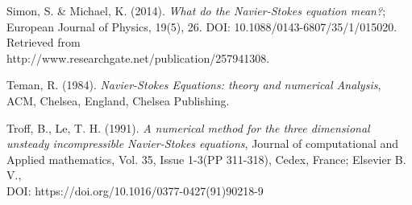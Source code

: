\documentclass[11pt]{report}
\begin{document}
\begin{description}
		\item Simon, S. \& Michael, K. (2014). \emph{What do the Navier-Stokes equation mean?}; European Journal of Physics, 19(5), 26. DOI: 10.1088/0143-6807/35/1/015020. Retrieved from \\
		http://www.researchgate.net/publication/257941308.
		
		\item Teman, R. (1984). \emph{Navier-Stokes Equations: theory and numerical Analysis}, ACM, Chelsea, England, Chelsea Publishing.
		
		\item Troff, B., Le, T. H. (1991). \emph{A numerical method for the three dimensional unsteady incompressible Navier-Stokes equations}, Journal of computational and Applied mathematics, Vol. 35, Issue 1-3(PP 311-318), Cedex, France; Elsevier B. V., \\DOI: https://doi.org/10.1016/0377-0427(91)90218-9
	\end{description}
	
\end{document}
